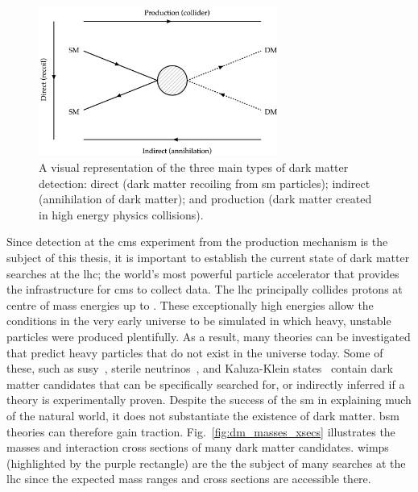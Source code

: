 \begin{figure}[htbp]
    \centering
    \includegraphics[width=0.7\textwidth]{figures/DM_detection_methods.png}
    \caption[A visual representation of the three main types of dark matter detection: direct, indirect, and production]{A visual representation of the three main types of dark matter detection: direct (dark matter recoiling from \acrlong{sm} particles); indirect (annihilation of dark matter); and production (dark matter created in high energy physics collisions).}
    \label{fig:dm_detection_methods}
\end{figure}

Since detection at the \acrshort{cms} experiment from the production mechanism is the subject of this thesis, it is important to establish the current state of dark matter searches at the \acrfull{lhc}; the world's most powerful particle accelerator that provides the infrastructure for \acrshort{cms} to collect data. The \acrshort{lhc} principally collides protons at centre of mass energies up to \comruntwo. These exceptionally high energies allow the conditions in the very early universe to be simulated in which heavy, unstable particles were produced plentifully. As a result, many theories can be investigated that predict heavy particles that do not exist in the universe today. Some of these, such as \acrfull{susy}~\cite{Martin:1997ns}, sterile neutrinos~\cite{doi:10.1142/S0218301313300191}, and Kaluza-Klein states~\cite{Han:1998sg} contain dark matter candidates that can be specifically searched for, or indirectly inferred if a theory is experimentally proven. Despite the success of the \acrlong{sm} in explaining much of the natural world, it does not substantiate the existence of dark matter. \acrshort{bsm} theories can therefore gain traction. Fig.~\ref{fig:dm_masses_xsecs} illustrates the masses and interaction cross sections of many dark matter candidates. \Glspl{wimp} (highlighted by the purple rectangle) are the the subject of many searches at the \acrshort{lhc} since the expected mass ranges and cross sections are accessible there.

